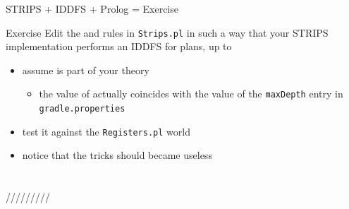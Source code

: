 \documentclass[presentation]{beamer}\mode<presentation>{\usetheme{AMSBolognaFC}}
\begin{document}
\begin{frame}[c]{STRIPS + IDDFS + Prolog = Exercise}
	
	\startExercise

	\begin{block}{Exercise \currentExercise}
		Edit the  and  rules in \texttt{Strips.pl} in such a way that your STRIPS implementation performs an IDDFS for plans, up to 
		\begin{itemize}
			\item assume  is part of your theory
			\begin{itemize}
				\item the value of  actually coincides with the value of the \texttt{maxDepth} entry in \texttt{gradle.properties}
			\end{itemize}

			\item test it against the \texttt{Registers.pl} world

			\item notice that the  tricks should became useless
		\end{itemize}
	\end{block}


\end{frame}

\section*{}

\frame{\titlepage}

\section*{\refname}

\begin{frame}[c,noframenumbering]{\refname}
	\scriptsize
	\nocite{*}
	
	
\end{frame}
/////////

\end{document}
